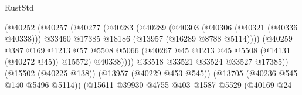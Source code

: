 \begin{lexlean}{RustStd}
\begin{coremodule}
                                              (@40252
                                                (@40257
                                                  (@40277
                                                    (@40283
                                                      (@40289
                                                        (@40303
                                                          (@40306 (@40321 (@40336 @40338)))
                                                          @33460
                                                          @17385
                                                          @18186
                                                          (@13957 (@16289 @8788 @5114))))
                                                      (@40259
                                                        @387
                                                        @169
                                                        @1213
                                                        @57
                                                        @5508
                                                        @5066
                                                        (@40267
                                                          @45
                                                          @1213
                                                          @45
                                                          @5508
                                                          (@14131 (@40272 @45))
                                                          @15572)
                                                        @40338))))
                                                @33518
                                                @33521
                                                @33524
                                                @33527
                                                @17385))
                                            (@15502 (@40225 @138))
                                            (@13957 (@40229 @453 @545))
                                            (@13705 (@40236 @545 @140 @5496 @5114))
                                            (@15611
                                              @39930
                                              @4755
                                              @403
                                              @1587
                                              @5529
                                              (@40169
                                                @24

\end{coremodule}
\end{lexlean}
